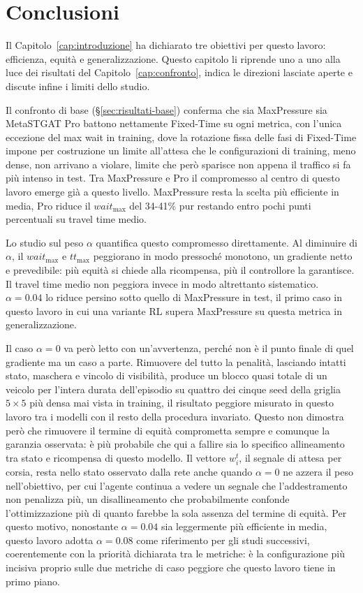 \chapter{Conclusioni}
\label{cap:conclusioni}

Il Capitolo~\ref{cap:introduzione} ha dichiarato tre obiettivi per questo
lavoro: efficienza, equità e generalizzazione. Questo capitolo li riprende
uno a uno alla luce dei risultati del Capitolo~\ref{cap:confronto}, indica
le direzioni lasciate aperte e discute infine i limiti dello studio.

Il confronto di base (§\ref{sec:risultati-base}) conferma che sia
MaxPressure sia MetaSTGAT Pro battono nettamente Fixed-Time su ogni
metrica, con l'unica eccezione del max wait in training, dove la
rotazione fissa delle fasi di Fixed-Time impone per costruzione un
limite all'attesa che le configurazioni di training, meno dense, non
arrivano a violare, limite che però sparisce non appena il traffico si
fa più intenso in test. Tra MaxPressure e Pro il compromesso al centro di
questo lavoro emerge già a questo livello. MaxPressure resta la scelta più
efficiente in media, Pro riduce il $wait_{\max}$ del 34-41\% pur restando entro
pochi punti percentuali su travel time medio.

Lo studio sul peso $\alpha$ quantifica questo compromesso direttamente. Al
diminuire di $\alpha$, il $wait_{\max}$ e $tt_{\max}$ peggiorano in modo
pressoché monotono, un gradiente netto e prevedibile: più equità si chiede
alla ricompensa, più il controllore la garantisce. Il travel time medio
non peggiora invece in modo altrettanto sistematico. $\alpha=0.04$ lo
riduce persino sotto quello di MaxPressure in test, il primo caso in
questo lavoro in cui una variante RL supera MaxPressure su questa metrica
in generalizzazione.

Il caso $\alpha=0$ va però letto con un'avvertenza, perché non è il punto
finale di quel gradiente ma un caso a parte. Rimuovere del tutto la
penalità, lasciando intatti stato, maschera e vincolo di visibilità,
produce un blocco quasi totale di un veicolo per l'intera durata
dell'episodio su quattro dei cinque seed della griglia $5\times5$ più
densa mai vista in training, il risultato peggiore misurato in questo
lavoro tra i modelli con il resto della procedura invariato. Questo non
dimostra però che rimuovere il termine di equità comprometta sempre e
comunque la garanzia osservata: è più probabile che qui a fallire sia lo
specifico allineamento tra stato e ricompensa di questo modello. Il
vettore $w_i^t$, il segnale di attesa per corsia, resta nello stato
osservato dalla rete anche quando $\alpha=0$ ne azzera il peso
nell'obiettivo, per cui l'agente continua a vedere un segnale che
l'addestramento non penalizza più, un disallineamento che probabilmente
confonde l'ottimizzazione più di quanto farebbe la sola assenza del
termine di equità. Per questo motivo, nonostante $\alpha=0.04$ sia
leggermente più efficiente in media, questo lavoro adotta $\alpha=0.08$
come riferimento per gli studi successivi, coerentemente con la priorità
dichiarata tra le metriche: è la configurazione più incisiva proprio sulle
due metriche di caso peggiore che questo lavoro tiene in primo piano.

